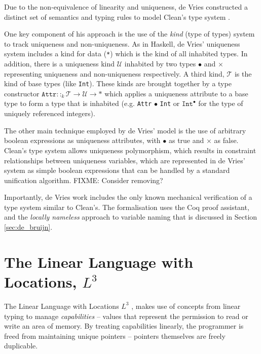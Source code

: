 \documentclass[]{unswthesis}
\begin{document}
Due to the non-equivalence of linearity and uniqueness, de Vries constructed a distinct set of semantics and typing rules to model Clean's type system \cite{deVries08}.

One key component of his approach is the use of the \textit{kind} (type of types) system to track uniqueness and non-uniqueness. As in Haskell, de Vries' uniqueness system includes a kind for data (\texttt{*}) which is the kind of all inhabited types. In addition, there is a uniqueness kind $\mathcal{U}$ inhabited by two types $\bullet$ and $\times$ representing uniqueness and non-uniqueness respectively. A third kind, $\mathcal{T}$ is the kind of base types (like \texttt{Int}). These kinds are brought together by a type constructor $\texttt{Attr} ::_k \mathcal{T} \rightarrow \mathcal{U} \rightarrow *$ which applies a uniqueness attribute to a base type to form a type that is inhabited (e.g. \texttt{Attr} $\bullet$ \texttt{Int} or $\texttt{Int}^\bullet$ for the type of uniquely referenced integers).

The other main technique employed by de Vries' model is the use of arbitrary boolean expressions as uniqueness attributes, with $\bullet$ as true and $\times$ as false. Clean's type system allows uniqueness polymorphism, which results in constraint relationships between uniqueness variables, which are represented in de Vries' system as simple boolean expressions that can be handled by a standard unification algorithm. FIXME: Consider removing?

Importantly, de Vries work includes the only known mechanical verification of a type system similar to Clean's. The formalisation uses the Coq proof assistant, and the \textit{locally nameless} approach to variable naming that is discussed in Section \ref{sec:de_bruijn}.




\section{The Linear Language with Locations, $L^3$}

The Linear Language with Locations $L^3$ \cite{ahmed05}, makes use of concepts from linear typing to manage \textit{capabilities} -- values that represent the permission to read or write an area of memory. By treating capabilities linearly, the programmer is freed from maintaining unique pointers -- pointers themselves are freely duplicable.
\end{document}

